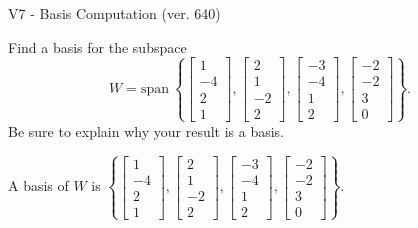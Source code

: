 \begin{exercise}
  \begin{exerciseTitle}V7 - Basis Computation (ver. 640)\end{exerciseTitle}
  \begin{exerciseStatement}
    Find a basis for the subspace 
\[W=\mathrm{span}\ \left\{\left[\begin{array}{r}
1 \\
-4 \\
2 \\
1
\end{array}\right] , \left[\begin{array}{r}
2 \\
1 \\
-2 \\
2
\end{array}\right] , \left[\begin{array}{r}
-3 \\
-4 \\
1 \\
2
\end{array}\right] , \left[\begin{array}{r}
-2 \\
-2 \\
3 \\
0
\end{array}\right]\right\}.\]
 Be sure to explain why your result is a basis.


  \end{exerciseStatement}
  \begin{exerciseAnswer}
   A basis of \(W\) is  \(\left\{\left[\begin{array}{r}
1 \\
-4 \\
2 \\
1
\end{array}\right] , \left[\begin{array}{r}
2 \\
1 \\
-2 \\
2
\end{array}\right] , \left[\begin{array}{r}
-3 \\
-4 \\
1 \\
2
\end{array}\right] , \left[\begin{array}{r}
-2 \\
-2 \\
3 \\
0
\end{array}\right]\right\}\).
  


  \end{exerciseAnswer}
\end{exercise}